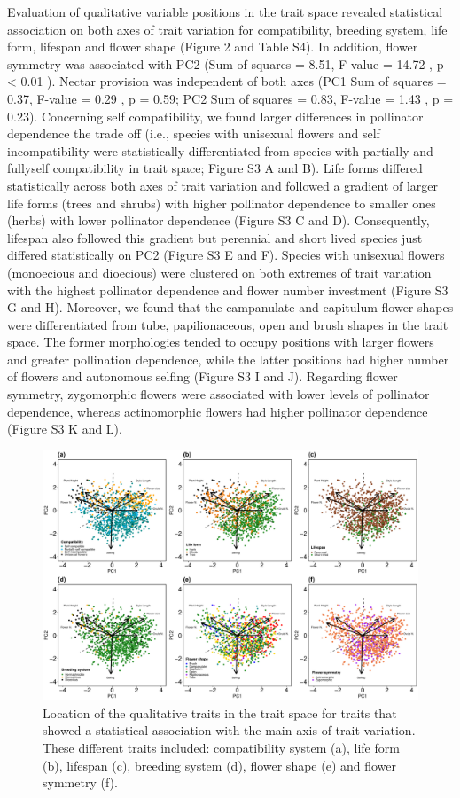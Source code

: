 \documentclass[12pt,a4paper,]{article}
\begin{document}
Evaluation of qualitative variable positions in the trait space revealed
statistical association on both axes of trait variation for
compatibility, breeding system, life form, lifespan and flower shape
(Figure 2 and Table S4). In addition, flower symmetry was associated
with PC2 (Sum of squares = 8.51, F-value = 14.72 , p \textless{} 0.01 ).
Nectar provision was independent of both axes (PC1 Sum of squares =
0.37, F-value = 0.29 , p = 0.59; PC2 Sum of squares = 0.83, F-value =
1.43 , p = 0.23). Concerning self compatibility, we found larger
differences in pollinator dependence the trade off (i.e., species with
unisexual flowers and self incompatibility were statistically
differentiated from species with partially and fullyself compatibility
in trait space; Figure S3 A and B). Life forms differed statistically
across both axes of trait variation and followed a gradient of larger
life forms (trees and shrubs) with higher pollinator dependence to
smaller ones (herbs) with lower pollinator dependence (Figure S3 C and
D). Consequently, lifespan also followed this gradient but perennial and
short lived species just differed statistically on PC2 (Figure S3 E and
F). Species with unisexual flowers (monoecious and dioecious) were
clustered on both extremes of trait variation with the highest
pollinator dependence and flower number investment (Figure S3 G and H).
Moreover, we found that the campanulate and capitulum flower shapes were
differentiated from tube, papilionaceous, open and brush shapes in the
trait space. The former morphologies tended to occupy positions with
larger flowers and greater pollination dependence, while the latter
positions had higher number of flowers and autonomous selfing (Figure S3
I and J). Regarding flower symmetry, zygomorphic flowers were associated
with lower levels of pollinator dependence, whereas actinomorphic
flowers had higher pollinator dependence (Figure S3 K and L).

\begin{figure}
\centering
\includegraphics{output/figures/unnamed-chunk-5-1.pdf}
\caption{\label{fig:unnamed-chunk-5}Location of the qualitative traits in
the trait space for traits that showed a statistical association with
the main axis of trait variation. These different traits included:
compatibility system (a), life form (b), lifespan (c), breeding system
(d), flower shape (e) and flower symmetry (f).}
\end{figure}
\end{document}
